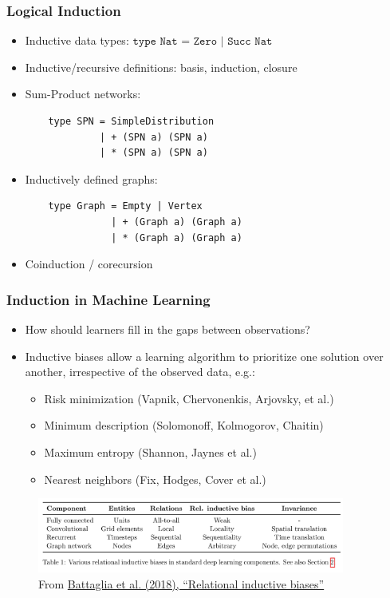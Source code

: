\documentclass{beamer}
\begin{document}
\begin{frame}[fragile]
  \frametitle{Logical Induction}
  \begin{itemize}
    \item Inductive data types: $\texttt{type Nat = Zero | Succ Nat}$
    \item Inductive/recursive definitions: basis, induction, closure
    \item Sum-Product networks:
    \begin{lstlisting}
    type SPN = SimpleDistribution
             | + (SPN a) (SPN a)
             | * (SPN a) (SPN a)
    \end{lstlisting}
    \item Inductively defined graphs:
    \begin{lstlisting}
    type Graph = Empty | Vertex
               | + (Graph a) (Graph a)
               | * (Graph a) (Graph a)
    \end{lstlisting}
    \item Coinduction / corecursion
  \end{itemize}
\end{frame}

\begin{frame}
  \frametitle{Induction in Machine Learning}
  \begin{itemize}
    \item How should learners fill in the gaps between observations?
    \item Inductive biases allow a learning algorithm to prioritize one solution over another, irrespective of the observed data, e.g.:
    \begin{itemize}
      \item Risk minimization (Vapnik, Chervonenkis, Arjovsky, et al.)
      \item Minimum description (Solomonoff, Kolmogorov, Chaitin)
      \item Maximum entropy (Shannon, Jaynes et al.)
      \item Nearest neighbors (Fix, Hodges, Cover et al.)
      \end{itemize}
  \end{itemize}
  \begin{figure}[H]
    \centering
    \includegraphics[width=0.9\textwidth]{../clipart/relational_inductive_biases.jpg}
    \caption{From \href{https://arxiv.org/pdf/1806.01261.pdf}{Battaglia et al. (2018), ``Relational inductive biases''}}
  \end{figure}
\end{frame}
\end{document}
